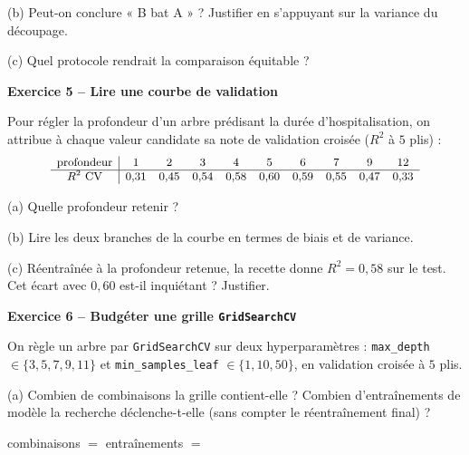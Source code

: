 \documentclass[10pt,a4paper]{article}
\newcommand{\repligne}{\par\vspace{0.42cm}\noindent\dotfill}
\newcommand{\zonecalcul}[1]{\par\vspace{0.15cm}\noindent{\small\emph{Espace de calcul :}}\par\vspace{#1}}
\begin{document}
\vspace{0.15cm}
(b) Peut-on conclure « B bat A » ? Justifier en s'appuyant sur la variance du découpage.
\repligne
\repligne

\vspace{0.15cm}
(c) Quel protocole rendrait la comparaison équitable ?
\repligne

\vspace{0.5cm}

\textbf{\large Exercice 5 -- Lire une courbe de validation}

\vspace{0.15cm}

Pour régler la profondeur d'un arbre prédisant la durée d'hospitalisation, on attribue à chaque valeur candidate sa note de validation croisée ($R^2$ à $5$ plis) :
\[
{\small
\begin{array}{c|ccccccccc}
\text{profondeur} & 1 & 2 & 3 & 4 & 5 & 6 & 7 & 9 & 12\\
\hline
R^2\ \text{CV} & 0{,}31 & 0{,}45 & 0{,}54 & 0{,}58 & 0{,}60 & 0{,}59 & 0{,}55 & 0{,}47 & 0{,}33
\end{array}}
\]

(a) Quelle profondeur retenir ? \makebox[2cm]{\dotfill}

\vspace{0.2cm}
(b) Lire les deux branches de la courbe en termes de biais et de variance.
\repligne
\repligne

\vspace{0.15cm}
(c) Réentraînée à la profondeur retenue, la recette donne $R^2 = 0{,}58$ sur le test. Cet écart avec $0{,}60$ est-il inquiétant ? Justifier.
\repligne
\repligne

\vspace{0.5cm}

\textbf{\large Exercice 6 -- Budgéter une grille \texttt{GridSearchCV}}

\vspace{0.15cm}

On règle un arbre par \texttt{GridSearchCV} sur deux hyperparamètres : \texttt{max\_depth} $\in \{3, 5, 7, 9, 11\}$ et \texttt{min\_samples\_leaf} $\in \{1, 10, 50\}$, en validation croisée à $5$ plis.

\vspace{0.2cm}
(a) Combien de combinaisons la grille contient-elle ? Combien d'entraînements de modèle la recherche déclenche-t-elle (sans compter le réentraînement final) ?
\zonecalcul{1.0cm}
combinaisons $=$ \makebox[2cm]{\dotfill} \quad entraînements $=$ \makebox[3cm]{\dotfill}
\end{document}
